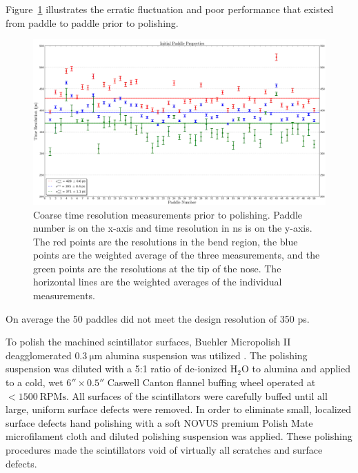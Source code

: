 Figure~\ref{fig:Initial_Paddle_Prop_UW} illustrates the erratic fluctuation and poor performance that existed from paddle to paddle prior to polishing. 
	\begin{figure}[!htb]
		\centering
		\includegraphics[width=1.0\columnwidth]{fabrication/figs/Initial_Paddle_Prop_UW}
		\caption{Coarse time resolution measurements prior to polishing. Paddle number is on the x-axis and time resolution in ns is on the y-axis. The red points are the resolutions in the bend region, the blue points are the weighted average of the three measurements, and the green points are the resolutions at the tip of the nose.  The horizontal lines are the weighted averages of the individual measurements.}
		\label{fig:Initial_Paddle_Prop_UW}
	\end{figure}
On average the 50 paddles did not meet the design resolution of 350 ps.

To polish the machined scintillator surfaces, Buehler Micropolish II deagglomerated $\mathrm{0.3\ \mu m}$ alumina suspension was utilized \cite{buehler}.  The polishing suspension was diluted with a 5:1 ratio of de-ionized $\mathrm{H_{2}O}$ to alumina and applied to a cold, wet $6'' \times 0.5''$ Caswell Canton flannel buffing wheel \cite{caswell} operated at $\mathrm{<1500~RPMs}$. All surfaces of the scintillators were carefully buffed until all large, uniform surface defects were removed. In order to eliminate small, localized surface defects hand polishing with a soft NOVUS premium Polish Mate microfilament cloth \cite{novus} and diluted polishing suspension was applied.  These polishing procedures made the scintillators void of virtually all scratches and surface defects.

